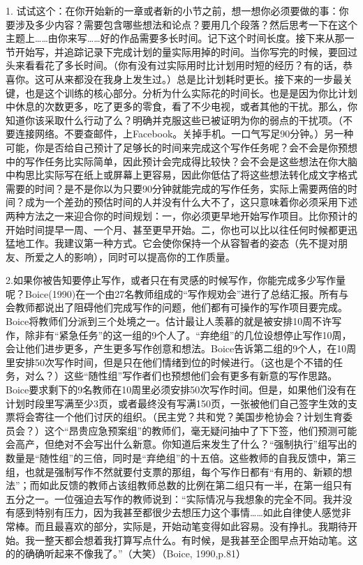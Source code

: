 \documentclass[12pt]{ctexart}
\begin{document}
1. 试试这个：在你开始新的一章或者新的小节之前，想一想你必须要做的事：你要涉及多少内容？需要包含哪些想法和论点？要用几个段落？然后思考一下在这个主题上……由你来写……好的作品需要多长时间。记下这个时间长度。接下来从那一节开始写，并追踪记录下完成计划的量实际用掉的时间。当你写完的时候，要回过头来看看花了多长时间。（你有没有过实际用时比计划用时短的经历？有的话，恭喜你。这可从来都没在我身上发生过。）总是比计划耗时更长。接下来的一步最关键，也是这个训练的核心部分。分析为什么实际花的时间长。也是是因为你比计划中休息的次数更多，吃了更多的零食，看了不少电视，或者其他的干扰。那么，你知道你该采取什么行动了么？明确并克服这些已被证明为你的弱点的干扰项。（不要连接网络。不要查邮件，上Facebook。关掉手机。一口气写足90分钟。）另一种可能，你是否给自己预计了足够长的时间来完成这个写作任务呢？会不会是你预想中的写作任务比实际简单，因此预计会完成得比较快？会不会是这些想法在你大脑中构思比实际写在纸上或屏幕上更容易，因此你低估了将这些想法转化成文字格式需要的时间？是不是你以为只要90分钟就能完成的写作任务，实际上需要两倍的时间？成为一个差劲的预估时间的人并没有什么大不了，这只意味着你必须采用下述两种方法之一来迎合你的时间规划：一，你必须更早地开始写作项目。比你预计的开始时间提早一周、一个月、甚至更早开始。二，你也可以比以往任何时候都更迅猛地工作。我建议第一种方式。它会使你保持一个从容智者的姿态（先不提对朋友、所爱之人的影响），同时可以提高你的工作质量。

2.如果你被告知要停止写作，或者只在有灵感的时候写作，你能完成多少写作量呢？Boice(1990)在一个由27名教师组成的“写作规劝会”进行了总结汇报。所有与会教师都说出了阻碍他们完成写作的问题，他们都有可操作的写作项目要完成。Boice将教师们分派到三个处境之一。估计最让人羡慕的就是被安排10周不许写作，除非有“紧急任务”的这一组的9个人了。“弃绝组”的几位设想停止写作10周，会让他们进步更多，产生更多写作创意和想法。Boice告诉第二组的9个人，在10周里安排50次写作时间，但是只在他们情绪到位的时候进行。（这也是个不错的任务，对么？）这些“随性组”写作者们也预想他们会有更多有新意的写作思路。Boice要求剩下的9名教师在10周里必须安排50次写作时间。但是，如果他们没有在计划时段里写满至少3页，或者最终没有写满150页，一张被他们自己签字生效的支票将会寄往一个他们讨厌的组织。（民主党？共和党？美国步枪协会？计划生育委员会？）这个“昂贵应急预案组”的教师们，毫无疑问抽中了下下签，他们预测可能会高产，但绝对不会写出什么新意。你知道后来发生了什么？“强制执行”组写出的数量是“随性组”的三倍，同时是“弃绝组”的十五倍。这些教师的自我反馈中，第三组，也就是强制写作不然就要付支票的那组，每个写作日都有“有用的、新颖的想法”；而如此反馈的教师占该组教师总数的比例在第二组只有一半，在第一组只有五分之一。一位强迫去写作的教师说到：“实际情况与我想象的完全不同。我并没有感到特别有压力，因为我甚至都很少去想压力这个事情……如此自律使人感觉非常棒。而且最喜欢的部分，实际是，开始动笔变得如此容易。没有挣扎。我期待开始。我一整天都会想着我打算写点什么。有时候，是我甚至企图早点开始动笔。这的的确确听起来不像我了。”（大笑）（Boice, 1990,p.81）
\end{document}
